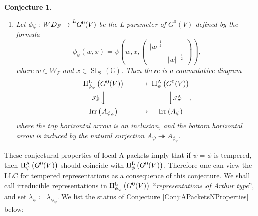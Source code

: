 \documentclass[11pt,letterpaper]{amsart}
\theoremstyle{plain}
\newcounter{theorem}[section]
\numberwithin{theorem}{section}
\numberwithin{equation}{subsection}
\newtheorem{Conj}[theorem]{Conjecture}
\theoremstyle{remark}
\newcommand{\SL}{\operatorname{SL}}
\newcommand{\Irr}{\operatorname{Irr}}
\newcommand{\C}{\mathbb{C}}
\def\calJ{\mathcal{J}}
\def\ra{\rightarrow}
\def\LP{\Pi^{\rm L}} %
\def\AP{\Pi^{\rm A}} %
\begin{document}
\begin{Conj}
\begin{enumerate}
    \item Let $\phi_\psi: WD_F \ra \prescript{L}{}{G^0(V)}$ be the L-parameter of $G^0(V)$ defined by the formula
    \[
        \phi_\psi\left(w,x\right) = \psi\left(w,x,\left(\begin{array}{cc}
            |w|^{\frac{1}{2}} & \\
             & |w|^{-\frac{1}{2}}
        \end{array}\right)\right),
    \]
    where $w\in W_F$ and $x\in \SL_2(\C)$. Then there is a commutative diagram
    \[
    \begin{CD}
{\LP_{\phi_\psi}\left(G^0(V)\right)} @>>> {\AP_\psi\left(G^0(V)\right)}\\
@V{\calJ^{\rm L}_{\mathscr{W}}}VV @VV{\calJ^{\rm A}_{\mathscr{W}}}V\\
{\Irr\left(A_{\phi_\psi}\right)} @>>> {\Irr\left(A_\psi\right)}
\end{CD},
    \]
    where the top horizontal arrow is an inclusion, and the bottom horizontal arrow is induced by the natural surjection $A_\psi\twoheadrightarrow A_{\phi_\psi}$.
\end{enumerate}
 \end{Conj} 

\vskip 5pt

These conjectural properties of local A-packets imply that if $\psi=\phi$ is tempered, then $\AP_\psi\left(G^0(V)\right)$ should coincide with $\LP_\phi\left(G^0(V)\right)$. Therefore one can view the LLC for tempered representations as a consequence of this conjecture. We shall call irreducible representations in $\LP_{\phi_\psi}\left(G^0(V)\right)$ ``\emph{representations of Arthur type}'', and set $\lambda_\psi\coloneqq\lambda_{\phi_\psi}$. We list the status of Conjecture \ref{Conj:APacketsNProperties} below:
\end{document}
